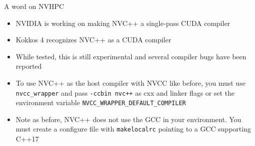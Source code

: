 \begin{frame}[fragile]{A word on NVHPC}
\begin{itemize}
  \item NVIDIA is working on making NVC++ a single-pass CUDA compiler
  \item Kokkos 4 recognizes NVC++ as a CUDA compiler
  \item While tested, this is still experimental and several compiler bugs have been reported
  \item To use NVC++ as the host compiler with NVCC like before, you must use \texttt{nvcc\_wrapper} and pass \texttt{-ccbin nvc++} as cxx and linker flags or set the environment variable \texttt{NVCC\_WRAPPER\_DEFAULT\_COMPILER}
  \item Note as before, NVC++ does not use the GCC in your environment. You must create a configure file with \texttt{makelocalrc} pointing to a GCC supporting C++17
\end{itemize}
\end{frame}

